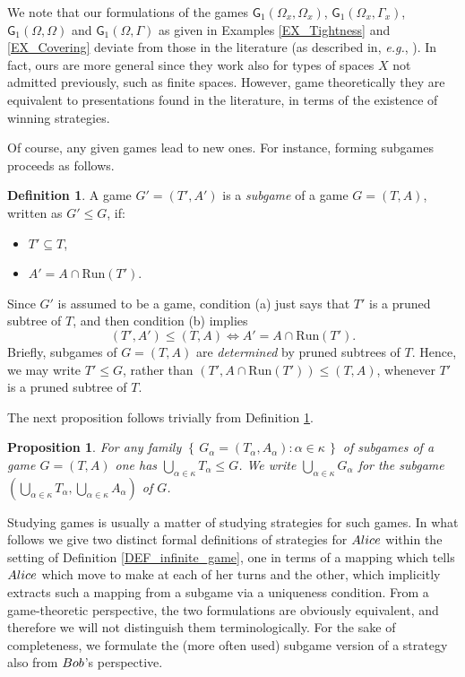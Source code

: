 \documentclass[12pt]{amsart}
\newtheorem{prop}[thm]{Proposition}
\theoremstyle{definition}
\newtheorem{defn}[thm]{Definition}
\newcommand{\set}[1]{\left\{\, {#1} \,\right\}}
\newcommand{\W}{{\Omega}}
\newcommand{\g}{\mathsf{G}}
\newcommand{\ali}{\textup{\textmd{\textsc{Alice}}}}
\newcommand{\bob}{\textup{\textmd{\textsc{Bob}}}}
\newcommand{\Run}{{\mathrm{Run}}}
\begin{document}
We note that our formulations of the games $\g_1(\W_x,\W_x)$, $\g_1(\W_x,\Gamma_x)$, $\g_1(\W,\W)$ and $\g_1(\W,\Gamma)$ as given in Examples \ref{EX_Tightness} and \ref{EX_Covering} deviate from those in the literature (as described in, {\em e.g.}, \cite{Scheepers1997}). In fact, ours are more general since they work also for types of spaces $X$ not admitted previously, such as finite spaces. However, game theoretically they are equivalent to presentations found in the literature, in terms of the existence of winning strategies.

Of course, any given games lead to new ones. For instance, forming subgames proceeds as follows.


\begin{defn}\label{DEF_SubGames}
	A game $G' = (T',A')$ is a \textit{subgame} of a game $G=(T,A)$, written as $G'\le G$, if: 
	\begin{itemize}
		\item[(a)] $T' \subseteq T$,
		\item[(b)] $A' = A \cap \Run(T')$.
	\end{itemize}
\end{defn}


Since $G'$ is assumed to be a game, condition (a) just says that $T'$ is a pruned subtree of $T$, and then condition (b) implies 
\[
(T',A')\le (T,A) \iff A'= A \cap \Run(T').
\]
Briefly, subgames of $G=(T,A)$ are \emph{determined} by pruned subtrees of $T$. Hence, we may write $T'\le G$, rather than $(T', A \cap \Run(T'))\le (T,A)$, whenever $T'$ is a pruned subtree of $T$. 

The next proposition follows trivially from Definition \ref{DEF_SubGames}.
\begin{prop}\label{PROP_UnionSubGame}
	For any family $\set{G_\alpha = (T_\alpha, A_\alpha): \alpha \in \kappa}$ of subgames of a game $G = (T,A)$ one has $\bigcup_{\alpha \in \kappa}T_\alpha\le G$. We write $\bigcup_{\alpha \in \kappa}G_\alpha$ for the subgame $(\bigcup_{\alpha \in \kappa}T_\alpha, \bigcup_{\alpha \in \kappa}A_\alpha)$ of $G$.
\end{prop}


Studying games is usually a matter of studying strategies for such games. In what follows we give two distinct formal definitions of strategies for $\ali$ within the setting of Definition \ref{DEF_infinite_game}, one in terms of a mapping which tells $\ali$ which move to make at each of her turns and the other, which implicitly extracts such a mapping from a subgame via a uniqueness condition. From a game-theoretic perspective, the two formulations are obviously equivalent, and therefore we will not distinguish them terminologically. For the sake of completeness, we formulate the (more often used) subgame version of a strategy also from $\bob$'s perspective.
\end{document}
